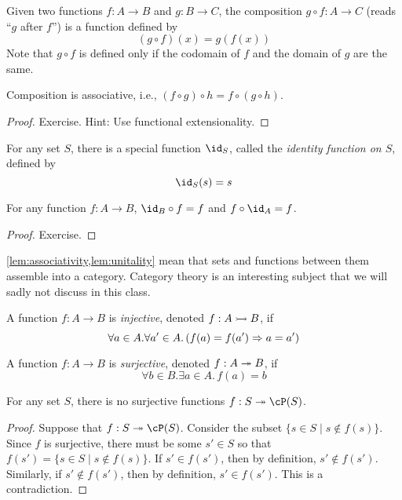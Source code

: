 \documentclass{amsart}
\begin{document}
\begin{defn}
  Given two functions $f : A \to B$ and $g : B \to C$, the composition $g \circ f : A \to C$ (reads ``$g$ after $f$'') is a function defined by
  \[
    (g \circ f)(x) = g(f(x))
  \]
  Note that $g \circ f$ is defined only if the codomain of $f$ and the domain of $g$ are the same.
\end{defn}

\begin{lem}\label{lem:associativity}
  Composition is associative, i.e., $(f \circ g) \circ h = f \circ (g \circ h)$.
\end{lem}
\begin{proof}
  Exercise.
  Hint: Use functional extensionality.
\end{proof}

\begin{defn}
  For any set $S$, there is a special function $\id_{S}$, called the \emph{identity function on $S$}, defined by
  \[
    \id_{S}(s) = s
  \]
\end{defn}

\begin{lem}\label{lem:unitality}
  For any function $f : A \to B$, $\id_{B} \circ f = f$ and $f \circ \id_{A} = f$.
\end{lem}
\begin{proof}
  Exercise.
\end{proof}

\cref{lem:associativity,lem:unitality} mean that sets and functions between them assemble into a category.
Category theory is an interesting subject that we will sadly not discuss in this class.

\begin{defn}
  A function $f : A \to B$ is \emph{injective}, denoted $f : A \rightarrowtail B$, if
  \[
    \forall a \in A.\forall a' \in A.\,(f(a) = f(a') \Rightarrow a = a')
  \]
\end{defn}

\begin{defn}
  A function $f : A \to B$ is \emph{surjective}, denoted $f : A \twoheadrightarrow B$, if
  \[
    \forall b \in B.\exists a \in A.\,f(a) = b
  \]
\end{defn}

\begin{thm}
  For any set $S$, there is no surjective functions $f : S \epi \cP(S)$.
\end{thm}
\begin{proof}
  Suppose that $f : S \epi \cP(S)$.
  Consider the subset $\{s \in S \mid s \notin f(s)\}$.
  Since $f$ is surjective, there must be some $s' \in S$ so that $f(s') = \{s \in S \mid s \notin f(s)\}$.
  If $s' \in f(s')$, then by definition, $s' \notin f(s')$.
  Similarly, if $s' \notin f(s')$, then by definition, $s' \in f(s')$.
  This is a contradiction.
\end{proof}
\end{document}
